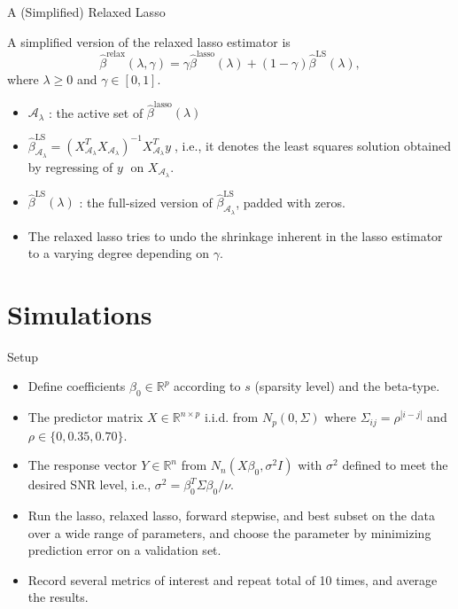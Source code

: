\documentclass[blue, 10pt]{beamer}
\begin{document}
\begin{frame}{A (Simplified) Relaxed Lasso}

  A simplified version of the relaxed lasso estimator is
  $$\hat{\beta}^{\text{relax}}(\lambda, \gamma) = \gamma \hat{\beta}^{\text{lasso}} (\lambda) + (1 - \gamma) \hat{\beta}^{\text{LS}}(\lambda),$$
  where $\lambda \ge 0$ and $\gamma \in [0, 1]$.

  \begin{itemize}
    \item $\mathcal{A}_{\lambda}$ : the active set of $\hat{\beta}^{\text{lasso}} (\lambda)$
    \item $\hat{\beta}^{\text{LS}}_{\mathcal{A}_{\lambda}} = (X_{\mathcal{A}_{\lambda}}^T X_{\mathcal{A}_{\lambda}})^{-1} X_{\mathcal{A}_{\lambda}}^T y\;$, i.e., it denotes the least squares solution obtained by regressing of $y\;$ on $X_{\mathcal{A}_\lambda}$.
    \item $\hat{\beta}^{\text{LS}}(\lambda)$ : the full-sized version of $\hat{\beta}^{\text{LS}}_{\mathcal{A}_{\lambda}}$, padded with zeros.
    \item The relaxed lasso tries to undo the shrinkage inherent in the lasso estimator to a varying degree depending on $\gamma$.
  \end{itemize}

\end{frame}


\section{Simulations}

\begin{frame}{Setup}

  \begin{itemize}
    \item Define coefficients $\beta_0 \in \mathbb{R}^p$ according to $s$ (sparsity level) and the beta-type.
    \item The predictor matrix $X \in \mathbb{R}^{n \times p}$ i.i.d. from $N_p(0, \Sigma)$ where $\Sigma_{ij} = \rho^{|i - j|}$ and $\rho \in \{0, 0.35, 0.70\}$.
    \item The response vector $Y \in \mathbb{R}^n$ from $N_n(X\beta_0, \sigma^2 I)$ with $\sigma^2$ defined to meet the desired SNR level, i.e., $\sigma^2 = \beta_0^T \Sigma \beta_0 / \nu$.
    \item Run the lasso, relaxed lasso, forward stepwise, and best subset on the data over a wide range of parameters, and choose the parameter by minimizing prediction error on a validation set.
    \item Record several metrics of interest and repeat total of 10 times, and average the results.
  \end{itemize}

\end{frame}
\end{document}
